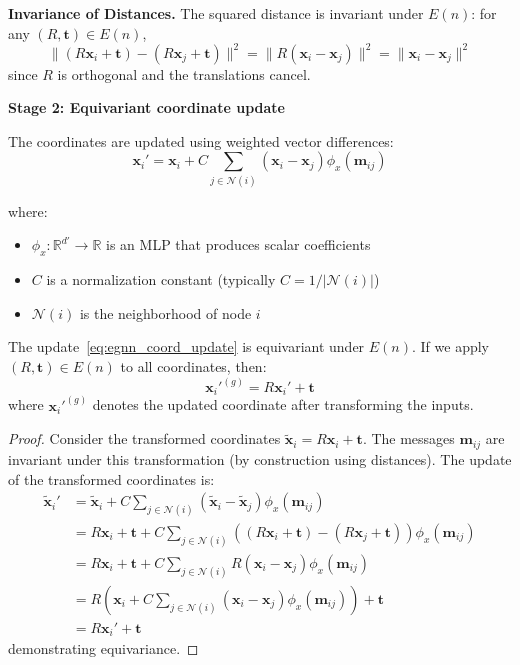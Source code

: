 \textbf{Invariance of Distances.} The squared distance is invariant under $E(n)$: for any $(R, \mathbf{t}) \in E(n)$,
\begin{equation}
\|(R\mathbf{x}_i + \mathbf{t}) - (R\mathbf{x}_j + \mathbf{t})\|^2 = \|R(\mathbf{x}_i - \mathbf{x}_j)\|^2 = \|\mathbf{x}_i - \mathbf{x}_j\|^2
\end{equation}
since $R$ is orthogonal and the translations cancel.

\textbf{Stage 2: Equivariant coordinate update}

The coordinates are updated using weighted vector differences:
\begin{equation}\label{eq:egnn_coord_update}
\mathbf{x}_i' = \mathbf{x}_i + C \sum_{j \in \mathcal{N}(i)} (\mathbf{x}_i - \mathbf{x}_j) \phi_x(\mathbf{m}_{ij})
\end{equation}

where:
\begin{itemize}
    \item $\phi_x: \mathbb{R}^{d'} \to \mathbb{R}$ is an MLP that produces scalar coefficients
    \item $C$ is a normalization constant (typically $C = 1/|\mathcal{N}(i)|$)
    \item $\mathcal{N}(i)$ is the neighborhood of node $i$
\end{itemize}

\begin{proposition}\label{prop:egnn_coord_equivariance}
The update~\eqref{eq:egnn_coord_update} is equivariant under $E(n)$. If we apply $(R, \mathbf{t}) \in E(n)$ to all coordinates, then:
\begin{equation}
\mathbf{x}_i'^{(g)} = R\mathbf{x}_i' + \mathbf{t}
\end{equation}
where $\mathbf{x}_i'^{(g)}$ denotes the updated coordinate after transforming the inputs.
\end{proposition}

\begin{proof}
Consider the transformed coordinates $\tilde{\mathbf{x}}_i = R\mathbf{x}_i + \mathbf{t}$. The messages $\mathbf{m}_{ij}$ are invariant under this transformation (by construction using distances). The update of the transformed coordinates is:
\begin{align}
\tilde{\mathbf{x}}_i' &= \tilde{\mathbf{x}}_i + C \sum_{j \in \mathcal{N}(i)} (\tilde{\mathbf{x}}_i - \tilde{\mathbf{x}}_j) \phi_x(\mathbf{m}_{ij}) \\
&= R\mathbf{x}_i + \mathbf{t} + C \sum_{j \in \mathcal{N}(i)} ((R\mathbf{x}_i + \mathbf{t}) - (R\mathbf{x}_j + \mathbf{t})) \phi_x(\mathbf{m}_{ij}) \\
&= R\mathbf{x}_i + \mathbf{t} + C \sum_{j \in \mathcal{N}(i)} R(\mathbf{x}_i - \mathbf{x}_j) \phi_x(\mathbf{m}_{ij}) \\
&= R\left(\mathbf{x}_i + C \sum_{j \in \mathcal{N}(i)} (\mathbf{x}_i - \mathbf{x}_j) \phi_x(\mathbf{m}_{ij})\right) + \mathbf{t} \\
&= R\mathbf{x}_i' + \mathbf{t}
\end{align}
demonstrating equivariance.
\end{proof}

